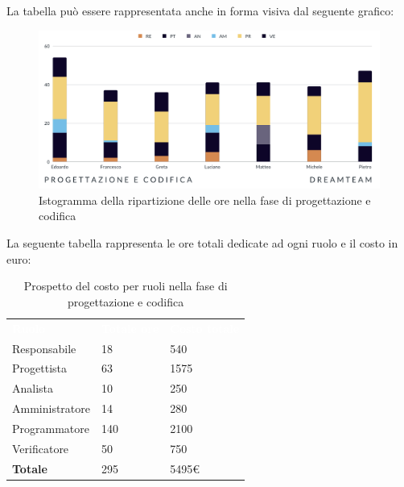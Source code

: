 La tabella può essere rappresentata anche in forma visiva dal seguente grafico:
\begin{figure}[H]
\centering
\includegraphics[scale=0.65]{Sezioni/SezioniPreventivo/grafici/Progettazione_codifica.png}
\caption{Istogramma della ripartizione delle ore nella fase di progettazione e codifica}
\end{figure}

La seguente tabella rappresenta le ore totali dedicate ad ogni ruolo e il costo in euro:

\begin{table}[H]
\begin{center}
\renewcommand{\arraystretch}{1.5}
\begin{tabular}{ m{}<{\centering}  m{}<{\centering} m{}<{\centering}}
	\rowcolor{darkblue}
	\textcolor{white}{\textbf{Ruolo}}&\textcolor{white}{\textbf{Totale ore}}&\textcolor{white}{\textbf{Costo totale}}\\ 

	Responsabile  & 18 & 540 \\	
	
	Progettista & 63 & 1575 \\
	
	Analista & 10 & 250 \\

	Amministratore & 14 & 280 \\
	
	Programmatore & 140 & 2100 \\
	
	Verificatore & 50 & 750 \\
	
	\textbf{Totale} & 295 & 5495\euro \\
	
\end{tabular}
\caption{Prospetto del costo per ruoli nella fase di progettazione e codifica}
\end{center}
\end{table}

